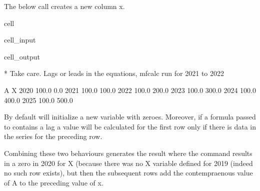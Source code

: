 \documentclass[letterpaper,10pt,english]{jupyterBook}
\begin{document}
\sphinxAtStartPar
The below call creates a new column x.

\begin{sphinxuseclass}{cell}\begin{sphinxVerbatimInput}

\begin{sphinxuseclass}{cell_input}
\begin{sphinxVerbatim}[commandchars=\\\{\}]
\end{sphinxVerbatim}

\end{sphinxuseclass}\end{sphinxVerbatimInput}
\begin{sphinxVerbatimOutput}

\begin{sphinxuseclass}{cell_output}
\begin{sphinxVerbatim}[commandchars=\\\{\}]
* Take care. Lags or leads in the equations, mfcalc run for 2021 to 2022
\end{sphinxVerbatim}

\begin{sphinxVerbatim}[commandchars=\\\{\}]
          A      X
2020  100.0    0.0
2021  100.0  100.0
2022  100.0  200.0
2023  100.0  300.0
2024  100.0  400.0
2025  100.0  500.0
\end{sphinxVerbatim}

\end{sphinxuseclass}\end{sphinxVerbatimOutput}

\end{sphinxuseclass}
\sphinxAtStartPar
{}

\sphinxAtStartPar
By default  will initialize a new variable with zeroes.
Moreover, if a formula passed to  contains a lag a value will be calculated for the first row only if there is data in the series for the preceding row.

\sphinxAtStartPar
Combining these two behaviours generates the result where the command  results in a zero in 2020 for X (because there was no X variable defined for 2019 (indeed no such row exists), but then the subsequent rows add the contempraenous value of A to the preceding value of x.
\end{document}
